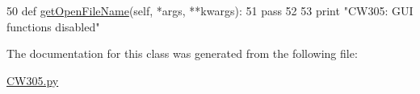 \begin{DoxyCode}
50         \textcolor{keyword}{def }\hyperlink{classsoftware_1_1chipwhisperer_1_1capture_1_1targets_1_1CW305_1_1QFileDialog_ad97ca2f44103ba62da20e2be102e6073}{getOpenFileName}(self, *args, **kwargs):
51             \textcolor{keywordflow}{pass}
52 
53     \textcolor{keywordflow}{print} \textcolor{stringliteral}{"CW305: GUI functions disabled"}
\end{DoxyCode}


The documentation for this class was generated from the following file\+:\begin{DoxyCompactItemize}
\item 
\hyperlink{CW305_8py}{C\+W305.\+py}\end{DoxyCompactItemize}

